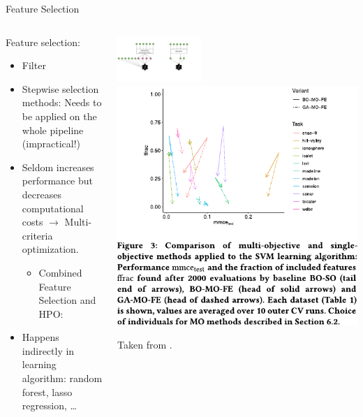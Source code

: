 \begin{frame}{Feature Selection}
    \begin{columns}
      \begin{column}{0.4\textwidth}
        Feature selection:
        \begin{itemize}
          \item Filter
          \item Stepwise selection methods: Needs to be applied on the whole pipeline (impractical!)
          \item Seldom increases performance but decreases computational costs $\rightarrow$ Multi-criteria optimization.
          \begin{itemize}
            \item Combined Feature Selection and HPO: 
          \end{itemize}
          \item Happens indirectly in learning algorithm: random forest, lasso regression, \ldots %
        \end{itemize}
      \end{column}%
      \begin{column}{0.6\textwidth}
        \begin{center}
          \includegraphics[width=0.35\textwidth, trim=450 100 110 60, clip]{images/feat_extr_vs_selection.pdf}%
          \includegraphics[width=0.55\linewidth]{images/Binder2020multiobjective_fig3.pdf}

          {\tiny \hfill Taken from .}
        \end{center}
      \end{column}
    \end{columns}
    
\end{frame}

